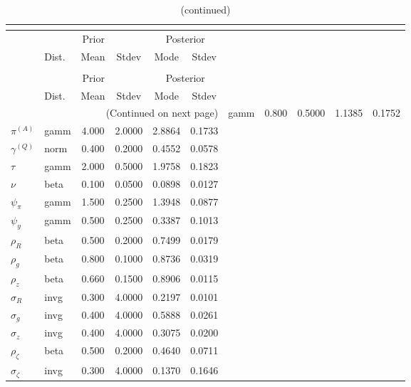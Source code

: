  
\begin{center}
\begin{longtable}{llcccc} 
\caption{Results from posterior maximization (parameters)}\\
 \label{Table:Posterior:1}\\
\toprule 
  & \multicolumn{3}{c}{Prior}  &  \multicolumn{2}{c}{Posterior} \\
  \cmidrule(r{.75em}){2-4} \cmidrule(r{.75em}){5-6}
  & Dist. & Mean  & Stdev & Mode & Stdev \\ 
\midrule \endfirsthead 
\caption{(continued)}\\
 \bottomrule 
  & \multicolumn{3}{c}{Prior}  &  \multicolumn{2}{c}{Posterior} \\
  \cmidrule(r{.75em}){2-4} \cmidrule(r{.75em}){5-6}
  & Dist. & Mean  & Stdev & Mode & Stdev \\ 
\midrule \endhead 
\bottomrule \multicolumn{6}{r}{(Continued on next page)}\endfoot 
\bottomrule\endlastfoot 
${r_{A}}$ & gamm &   0.800 & 0.5000 &   1.1385 &  0.1752 \\ 
${\pi^{(A)}}$ & gamm &   4.000 & 2.0000 &   2.8864 &  0.1733 \\ 
${\gamma^{(Q)}}$ & norm &   0.400 & 0.2000 &   0.4552 &  0.0578 \\ 
${\tau}$ & gamm &   2.000 & 0.5000 &   1.9758 &  0.1823 \\ 
${\nu}$ & beta &   0.100 & 0.0500 &   0.0898 &  0.0127 \\ 
${\psi_\pi}$ & gamm &   1.500 & 0.2500 &   1.3948 &  0.0877 \\ 
${\psi_y}$ & gamm &   0.500 & 0.2500 &   0.3387 &  0.1013 \\ 
${\rho_R}$ & beta &   0.500 & 0.2000 &   0.7499 &  0.0179 \\ 
${\rho_{g}}$ & beta &   0.800 & 0.1000 &   0.8736 &  0.0319 \\ 
${\rho_z}$ & beta &   0.660 & 0.1500 &   0.8906 &  0.0115 \\ 
${\sigma_R}$ & invg &   0.300 & 4.0000 &   0.2197 &  0.0101 \\ 
${\sigma_{g}}$ & invg &   0.400 & 4.0000 &   0.5888 &  0.0261 \\ 
${\sigma_z}$ & invg &   0.400 & 4.0000 &   0.3075 &  0.0200 \\ 
${\rho_\zeta}$ & beta &   0.500 & 0.2000 &   0.4640 &  0.0711 \\ 
${\sigma_\zeta}$ & invg &   0.300 & 4.0000 &   0.1370 &  0.1646 \\ 
\end{longtable}
 \end{center}
